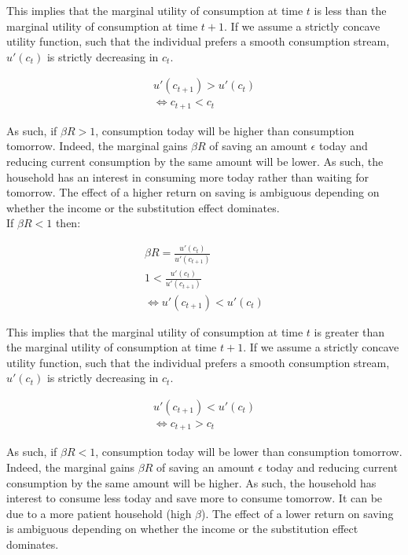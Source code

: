 \documentclass{article}
\begin{document}
This implies that the marginal utility of consumption at time $t$ is less than the marginal utility of consumption at time $t+1$. If we assume a strictly concave utility function, such that the individual prefers a smooth consumption stream, $u'(c_t)$ is strictly decreasing in $c_t$.

\begin{gather*}
    u'(c_{t+1}) > u'(c_t) \\
    \Leftrightarrow c_{t+1} < c_t
\end{gather*}

As such, if $\beta R>1$, 
consumption today will be higher than consumption tomorrow. Indeed, the marginal gains $\beta R$ of saving an amount $\epsilon$ today and reducing current consumption by the same amount will be lower. As such, the household has an interest in consuming more today rather than waiting for tomorrow. The effect of a higher return on saving is ambiguous depending on whether the income or the substitution effect dominates. \\

If $\beta R < 1$ then:

\begin{gather*}
        \beta R = \frac{u'(c_t)}{u'(c_{t+1})} \\
        1 < \frac{u'(c_t)}{u'(c_{t+1})} \\
        \Leftrightarrow u'(c_{t+1}) < u'(c_t)
\end{gather*}

This implies that the marginal utility of consumption at time $t$ is greater than the marginal utility of consumption at time $t+1$. If we assume a strictly concave utility function, such that the individual prefers a smooth consumption stream, $u'(c_t)$ is strictly decreasing in $c_t$.

\begin{gather*}
    u'(c_{t+1}) < u'(c_t) \\
    \Leftrightarrow c_{t+1} > c_t
\end{gather*}

As such, if $\beta R<1$, consumption today will be lower than consumption tomorrow. Indeed, the marginal gains $\beta R$ of saving an amount $\epsilon$ today and reducing current consumption by the same amount will be higher. As such, the household has interest to consume less today and save more to consume tomorrow. It can be due to a more patient household (high $\beta$). The effect of a lower return on saving is ambiguous depending on whether the income or the substitution effect dominates.
\end{document}
